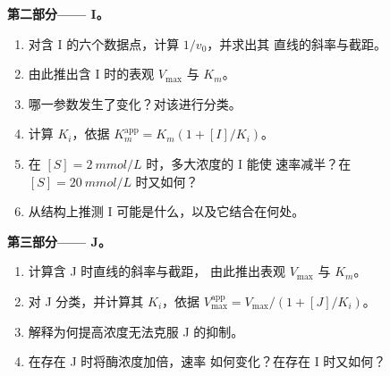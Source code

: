 \begin{problem}
\medskip
\noindent\textbf{第二部分—— I。}
\begin{enumerate}[resume]
  \item 对含 I 的六个数据点，计算 $1/v_0$，并求出其
        直线的斜率与截距。
  \item 由此推出含 I 时的表观 $V_{\max}$ 与 $K_m$。
  \item 哪一参数发生了变化？对该进行分类。
  \item 计算 $K_i$，依据 $K_m^{\text{app}} = K_m(1 + [I]/K_i)$。
  \item 在 $[S] = \qty{2}{mmol/L}$ 时，多大浓度的 I 能使
        速率减半？在 $[S] = \qty{20}{mmol/L}$ 时又如何？
  \item 从结构上推测 I 可能是什么，以及它结合在何处。
\end{enumerate}

\medskip
\noindent\textbf{第三部分—— J。}
\begin{enumerate}[resume]
  \item 计算含 J 时直线的斜率与截距，
        由此推出表观 $V_{\max}$ 与 $K_m$。
  \item 对 J 分类，并计算其 $K_i$，依据 $V_{\max}^{\text{app}} =
        V_{\max}/(1 + [J]/K_i)$。
  \item 解释为何提高浓度无法克服 J 的抑制。
  \item 在存在 J 时将酶浓度加倍，速率
        如何变化？在存在 I 时又如何？
\end{enumerate}


\end{problem}
